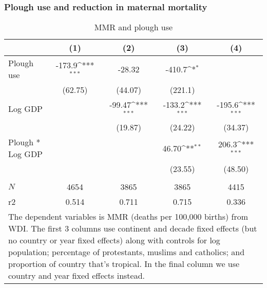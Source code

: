 \documentclass[10pt,letterpaper,subeqn]{beamer}
\begin{document}
\begin{frame}[label=PlowResults]
\frametitle{Plough use and reduction in maternal mortality}
\begin{table}[htbp]\centering
\def\sym#1{\ifmmode^{#1}\else\(^{#1}\)\fi}
\scriptsize
\caption{MMR and plough use}
\begin{tabular}{l*{4}{c}}
\hline\hline
            &\multicolumn{1}{c}{(1)}&\multicolumn{1}{c}{(2)}&\multicolumn{1}{c}{(3)}&\multicolumn{1}{c}{(4)}\\
\hline
Plough use        &      -173.9\sym{***}&      -28.32         &      -410.7\sym{*}  &                           \\
            &     (62.75)         &     (44.07)         &     (221.1)         &                                    \\

Log GDP        &                     &      -99.47\sym{***}&      -133.2\sym{***}&      -195.6\sym{***}\\
            &                     &     (19.87)         &     (24.22)         &     (34.37)               \\

Plough * Log GDP   &                     &                     &       46.70\sym{**} &       206.3\sym{***}               \\
            &                     &                     &     (23.55)         &     (48.50)                         \\

            &                     &                     &                     &                         \\
\hline
\(N\)       &        4654         &        3865         &        3865         &        4415               \\
r2          &       0.514         &       0.711         &       0.715         &       0.336                \\
\hline\hline
\multicolumn{5}{p{8cm}}{\footnotesize The dependent variables is MMR (deaths per 100,000 births) from WDI. The first 3 columns use continent and decade fixed effects (but no country or year fixed effects) along with controls for log population; percentage of protestants, muslims and catholics; and proportion of country that's tropical. In the final column we use country and year fixed effects instead.}\\
\end{tabular}
\end{table}
\end{frame}
\end{document}
